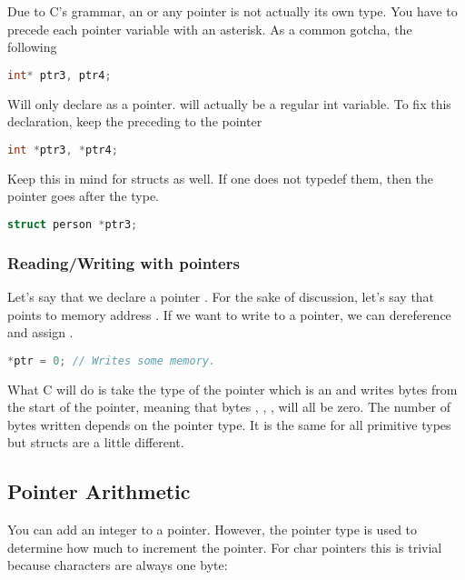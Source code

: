 Due to C's grammar, an  or any pointer is not actually its
own type. You have to precede each pointer variable with an asterisk. As
a common gotcha, the following

\begin{lstlisting}[language=C]
int* ptr3, ptr4;
\end{lstlisting}

Will only declare  as a pointer.  will
actually be a regular int variable. To fix this declaration, keep the
\keyword{*} preceding to the pointer

\begin{lstlisting}[language=C]
int *ptr3, *ptr4;
\end{lstlisting}

Keep this in mind for structs as well. If one does not typedef them, then the pointer goes after the type.

\begin{lstlisting}[language=C]
struct person *ptr3;
\end{lstlisting}

\subsubsection{Reading/Writing with pointers}

Let's say that we declare a pointer . For the sake of
discussion, let's say that  points to memory address
. If we want to write to a pointer, we can dereference
and assign .

\begin{lstlisting}[language=C]
*ptr = 0; // Writes some memory.
\end{lstlisting}

What C will do is take the type of the pointer which is an 
and writes  bytes from the start of the pointer,
meaning that bytes , , ,
 will all be zero. The number of bytes written depends on
the pointer type. It is the same for all primitive types but structs are
a little different.

\subsection{Pointer Arithmetic}

You can add an integer to a pointer. However, the pointer type is used
to determine how much to increment the pointer. For char pointers this
is trivial because characters are always one byte:

